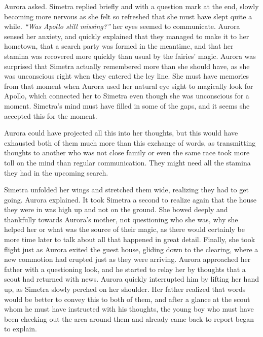  Aurora asked.  Simetra replied briefly and with a question mark at the end, slowly becoming more nervous as she felt so refreshed that she must have slept quite a while. \emph{\enquote{Was Apollo still missing?}} her eyes seemed to communicate. Aurora sensed her anxiety, and quickly explained that they managed to make it to her hometown, that a search party was formed in the meantime, and that her stamina was recovered more quickly than usual by the fairies' magic. Aurora was surprised that Simetra actually remembered more than she should have, as she was unconscious right when they entered the ley line. She must have memories from that moment when Aurora used her natural eye sight to magically look for Apollo, which connected her to Simetra even though she was unconscious for a moment. Simetra's mind must have filled in some of the gaps, and it seems she accepted this for the moment.

Aurora could have projected all this into her thoughts, but this would have exhausted both of them much more than this exchange of words, as transmitting thoughts to another who was not close family or even the same race took more toll on the mind than regular communication. They might need all the stamina they had in the upcoming search.

Simetra unfolded her wings and stretched them wide, realizing they had to get going.  Aurora explained. It took Simetra a second to realize again that the house they were in was high up and not on the ground. She bowed deeply and thankfully towards Aurora's mother, not questioning who she was, why she helped her or what was the source of their magic, as there would certainly be more time later to talk about all that happened in great detail. Finally, she took flight just as Aurora exited the guest house, gliding down to the clearing, where a new commotion had erupted just as they were arriving. Aurora approached her father with a questioning look, and he started to relay her by thoughts that a scout had returned with news. Aurora quickly interrupted him by lifting her hand up, as Simetra slowly perched on her shoulder. Her father realized that words would be better to convey this to both of them, and after a glance at the scout whom he must have instructed with his thoughts, the young boy who must have been checking out the area around them and already came back to report began to explain.

